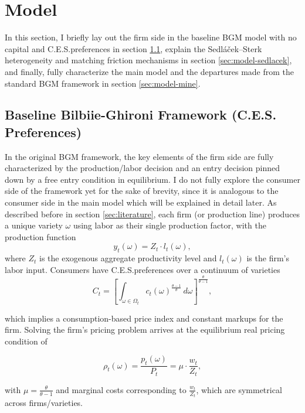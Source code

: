 \documentclass[a4paper,12pt]{article} %
\numberwithin{equation}{section} %
\numberwithin{figure}{section}
\numberwithin{table}{section}
\begin{document}
\section{Model}
\label{sec:model}

In this section, I briefly lay out the firm side in the baseline BGM model with no capital and C.E.S.preferences in section \ref{sec:model-bilbiie}, explain the Sedláček–Sterk
heterogeneity and matching friction mechanisms in section \ref{sec:model-sedlacek}, and finally, fully characterize the main model and the departures made
from the standard BGM framework in section \ref{sec:model-mine}. 

\subsection{Baseline Bilbiie-Ghironi Framework (C.E.S. Preferences)}
\label{sec:model-bilbiie}

In the original BGM framework, the key elements of the firm side are fully characterized by the production/labor decision 
and an entry decision pinned down by a free entry condition in equilibrium. I do not fully explore the consumer side of the framework yet for the sake of brevity, since it is analogous to the consumer side in the main model which will be 
explained in detail later. As described before in section \ref{sec:literature}, each firm (or production line) produces a unique variety $\omega$ using labor as their single 
production factor, with the production function 
\[
    y_t(\omega) = Z_t \cdot l_t(\omega),
\]
where $Z_t$ is the exogenous aggregate productivity level and $l_t(\omega)$ is the firm's labor input. Consumers have C.E.S.preferences over a continuum
of varieties 
\[
    C_t = \left[\int_{\omega \in \Omega_t} c_t(\omega)^{\frac{\theta-1}{\theta}}\,d\omega\right]^{\frac{\theta}{\theta-1}},
\]

which implies a consumption-based price index and constant markups for the firm. Solving the firm's pricing problem arrives at the equilibrium real pricing
condition of

 \[
    \rho_t(\omega) = \frac{p_t(\omega)}{P_t} =  \mu \cdot \frac{w_t}{Z_t},
 \]

with $\mu=\frac{\theta}{\theta-1}$ and marginal costs corresponding to $\frac{w_t}{Z_t}$, which are symmetrical across firms/varieties.
\end{document}
